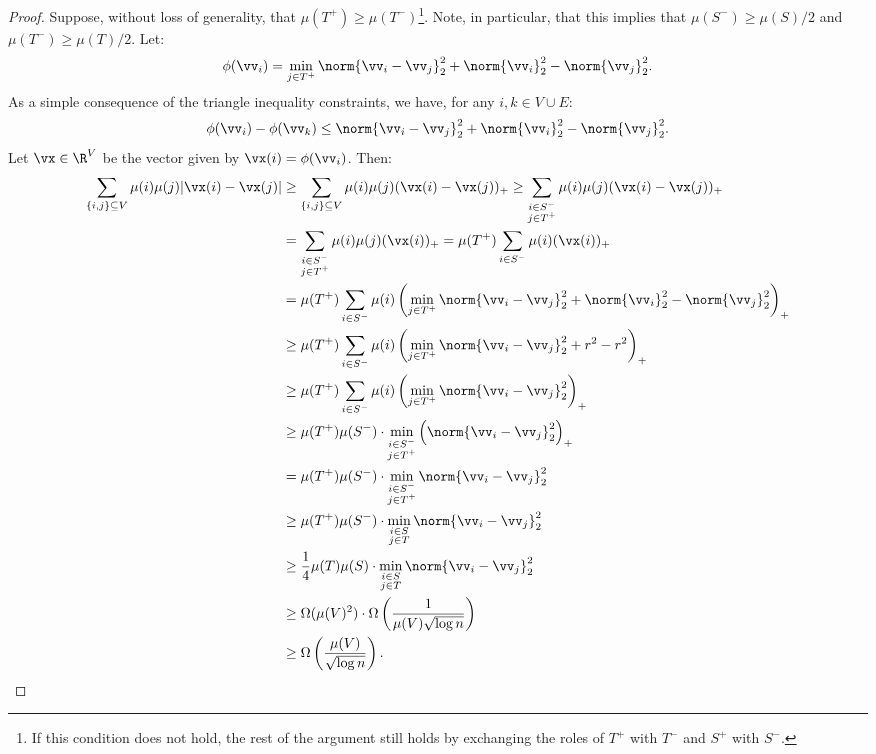 \documentclass[letterpaper]{article}
\begin{document}
\begin{proof}
    Suppose, without loss of generality, that $\mu(T^+) \geq \mu(T^-)$\footnote{If this condition does not hold, the rest of the argument still holds by exchanging the roles of $T^+$ with $T^-$ and $S^+$ with $S^-$.}. Note, in particular, that this implies that $\mu(S^-) \geq \mu(S)/2$ and $\mu(T^-) \geq \mu(T)/2$. Let:
    \[
        \phi(\vv_i) = \min_{j \in T^+} \norm{\vv_i - \vv_j}^2_2 + \norm{\vv_i}_2^2 -\norm{\vv_j}_2^2.
    \]
     As a simple consequence of the triangle inequality constraints, we have, for any $i,k \in V\cup E$:
    \[
        \phi(\vv_i) - \phi(\vv_k) \leq \norm{\vv_i - \vv_j}_2^2 + \norm{\vv_i}_2^2 - \norm{\vv_j}_2^2.
    \]
    Let $\vx \in \R^V$ be the vector given by $\vx(i) = \phi(\vv_i)$. Then:
    \begin{align*}
        \sum_{\{i,j\}\subseteq V} \mu(i) \mu(j) |\vx(i) - \vx(j)| &\geq \sum_{\{i,j\}\subseteq V} \mu(i) \mu(j) (\vx(i) - \vx(j))_+ \geq \sum_{\substack{i\in S^-\\ j\in T^+}} \mu(i) \mu(j) (\vx(i) - \vx(j))_+\\
        &=\sum_{\substack{i\in S^-\\ j\in T^+}} \mu(i) \mu(j) (\vx(i))_+ = \mu(T^+) \sum_{i\in S^-} \mu(i) (\vx(i))_+\\
        &= \mu(T^+) \sum_{i\in S^-} \mu(i) \left(\min_{j\in T^+}\norm{\vv_i -\vv_j}_2^2 +\norm{\vv_i}_2^2 - \norm{\vv_j}_2^2\right)_+\\
        &\geq \mu(T^+) \sum_{i\in S^-} \mu(i) \left(\min_{j\in T^+}\norm{\vv_i -\vv_j}_2^2 +r^2 - r^2\right)_+\\
        &\geq \mu(T^+) \sum_{i\in S^-} \mu(i) \left(\min_{j\in T^+}\norm{\vv_i -\vv_j}_2^2 \right)_+\\
        &\geq \mu(T^+) \mu(S^-) \cdot \min_{\substack{i\in S^-\\ j\in T^+}}\left(\norm{\vv_i -\vv_j}_2^2
        \right)_+\\
        &= \mu(T^+) \mu(S^-) \cdot\min_{\substack{i\in S^-\\ j\in T^+}}\norm{\vv_i -\vv_j}_2^2\\
        &\geq \mu(T^+) \mu(S^-) \cdot \min_{\substack{i\in S\\ j\in T}}\norm{\vv_i -\vv_j}_2^2\\
        &\geq {1\over 4}\mu(T) \mu(S) \cdot \min_{\substack{i\in S\\ j\in T}}\norm{\vv_i -\vv_j}_2^2\\
        &\geq \Omega(\mu(V)^2) \cdot \Omega\left({1 \over \mu(V) \sqrt{\log n}}\right)\\
        &\geq \Omega \left(\mu(V) \over \sqrt{\log n}\right).
    \end{align*}


\end{proof}
\end{document}
